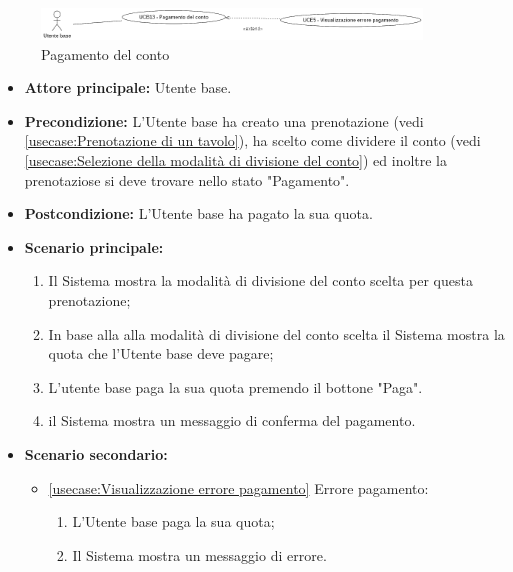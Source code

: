 \label{usecase:Pagamento del conto}

\begin{figure}[h]
	\centering
	\includegraphics[width=0.9\textwidth]{./uml/UCB13.png} 
	\caption{Pagamento del conto}
	\label{fig:UCB15}
  \end{figure}

\begin{itemize}
	\item \textbf{Attore principale:} Utente base.

	\item \textbf{Precondizione:} L'Utente base ha creato una prenotazione (vedi \autoref{usecase:Prenotazione di un tavolo}), ha 
	scelto come dividere il conto (vedi \autoref{usecase:Selezione della modalità di divisione del conto}) ed inoltre la prenotaziose si deve trovare nello stato "Pagamento".

	\item \textbf{Postcondizione:} L'Utente base ha pagato la sua quota.

	\item \textbf{Scenario principale:}
            \begin{enumerate}
				\item Il Sistema mostra la modalità di divisione del conto scelta per questa prenotazione;
                \item In base alla alla modalità di divisione del conto scelta il Sistema mostra la quota che l'Utente base deve pagare;
				\item L'utente base paga la sua quota premendo il bottone "Paga".
				\item il Sistema mostra un messaggio di conferma del pagamento.
	      \end{enumerate}

    \item \textbf{Scenario secondario:}
		  \begin{itemize}
			  \item \autoref{usecase:Visualizzazione errore pagamento} Errore pagamento:
				\begin{enumerate}
					\item L'Utente base paga la sua quota;
					\item  Il Sistema mostra un messaggio di errore.
				\end{enumerate}
		  \end{itemize}
\end{itemize}